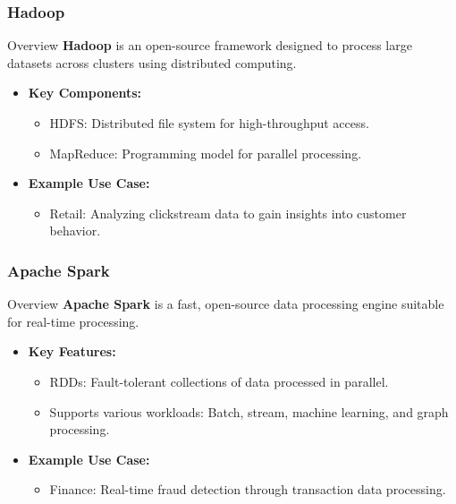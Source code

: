 \documentclass[aspectratio=169]{beamer}
\begin{document}
\begin{frame}[fragile]
    \frametitle{Hadoop}
    \begin{block}{Overview}
        \textbf{Hadoop} is an open-source framework designed to process large datasets across clusters using distributed computing.
    \end{block}
    \begin{itemize}
        \item \textbf{Key Components:}
        \begin{itemize}
            \item HDFS: Distributed file system for high-throughput access.
            \item MapReduce: Programming model for parallel processing.
        \end{itemize}
        \item \textbf{Example Use Case:}
        \begin{itemize}
            \item Retail: Analyzing clickstream data to gain insights into customer behavior.
        \end{itemize}
    \end{itemize}
\end{frame}

\begin{frame}[fragile]
    \frametitle{Apache Spark}
    \begin{block}{Overview}
        \textbf{Apache Spark} is a fast, open-source data processing engine suitable for real-time processing.
    \end{block}
    \begin{itemize}
        \item \textbf{Key Features:}
        \begin{itemize}
            \item RDDs: Fault-tolerant collections of data processed in parallel.
            \item Supports various workloads: Batch, stream, machine learning, and graph processing.
        \end{itemize}
        \item \textbf{Example Use Case:}
        \begin{itemize}
            \item Finance: Real-time fraud detection through transaction data processing.
        \end{itemize}
    \end{itemize}
\end{frame}
\end{document}
